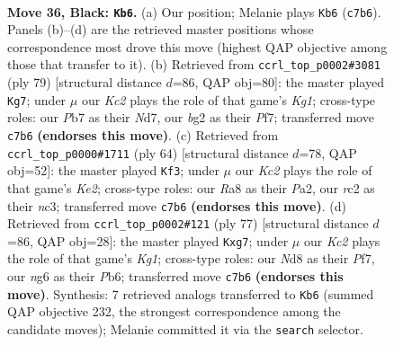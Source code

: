 \documentclass[11pt]{article}
\begin{document}
\clearpage

\begin{figure}[p]\centering
\begin{subfigure}{0.46\textwidth}\centering
\resizebox{\linewidth}{!}{%
\newchessgame
\chessboard[
  setfen={r2n2Q1/1pk3p1/p4pN1/6np/3R4/4P1P1/PPR2PBP/6K1 b - - 2 36},
  showmover=false,
  pgfstyle=straightmove, color=movearrow, markmove={c7-b6}
]}
\caption{}
\end{subfigure}\hfill
\begin{subfigure}{0.46\textwidth}\centering
\resizebox{\linewidth}{!}{%
\newchessgame
\chessboard[
  setfen={2R3k1/3n1p2/1q2p1p1/r2n3p/p2PN3/Q3P2P/5PP1/3B2K1 b - - 21 40},
  showmover=false,
  pgfstyle=straightmove, color=movearrow, markmove={g8-g7}
]}
\caption{}
\end{subfigure}
\\[4pt]
\begin{subfigure}{0.46\textwidth}\centering
\resizebox{\linewidth}{!}{%
\newchessgame
\chessboard[
  setfen={5k2/p3pp2/1p2r1p1/7p/1PPR1P2/2n1N1P1/P3K2P/8 w - - 7 33},
  showmover=false,
  pgfstyle=straightmove, color=movearrow, markmove={e2-f3}
]}
\caption{}
\end{subfigure}\hfill
\begin{subfigure}{0.46\textwidth}\centering
\resizebox{\linewidth}{!}{%
\newchessgame
\chessboard[
  setfen={3r2k1/p2n1pQp/1p1P4/5p1p/2B2P2/P3R1P1/1P4K1/8 b - - 0 39},
  showmover=false,
  pgfstyle=straightmove, color=movearrow, markmove={g8-g7}
]}
\caption{}
\end{subfigure}
\caption{\textbf{Move 36, Black: \texttt{Kb6}.} (a) Our position; Melanie plays \texttt{Kb6} (\texttt{c7b6}). Panels (b)--(d) are the retrieved master positions whose correspondence most drove this move (highest QAP objective among those that transfer to it). (b) Retrieved from \texttt{ccrl\_top\_p0002\#3081} (ply 79) [structural distance $d$=86, QAP obj=80]: the master played \texttt{Kg7}; under $\mu$ our \emph{Kc2} plays the role of that game's \emph{Kg1}; cross-type roles: our \emph{P}b7 as their \emph{N}d7, our \emph{b}g2 as their \emph{P}f7; transferred move \texttt{c7b6} \textbf{(endorses this move)}. (c) Retrieved from \texttt{ccrl\_top\_p0000\#1711} (ply 64) [structural distance $d$=78, QAP obj=52]: the master played \texttt{Kf3}; under $\mu$ our \emph{Kc2} plays the role of that game's \emph{Ke2}; cross-type roles: our \emph{R}a8 as their \emph{P}a2, our \emph{r}c2 as their \emph{n}c3; transferred move \texttt{c7b6} \textbf{(endorses this move)}. (d) Retrieved from \texttt{ccrl\_top\_p0002\#121} (ply 77) [structural distance $d$=86, QAP obj=28]: the master played \texttt{Kxg7}; under $\mu$ our \emph{Kc2} plays the role of that game's \emph{Kg1}; cross-type roles: our \emph{N}d8 as their \emph{P}f7, our \emph{n}g6 as their \emph{P}b6; transferred move \texttt{c7b6} \textbf{(endorses this move)}. Synthesis: 7 retrieved analogs transferred to \texttt{Kb6} (summed QAP objective 232, the strongest correspondence among the candidate moves); Melanie committed it via the \texttt{search} selector.}
\label{fig:thought-m71}
\end{figure}
\end{document}
